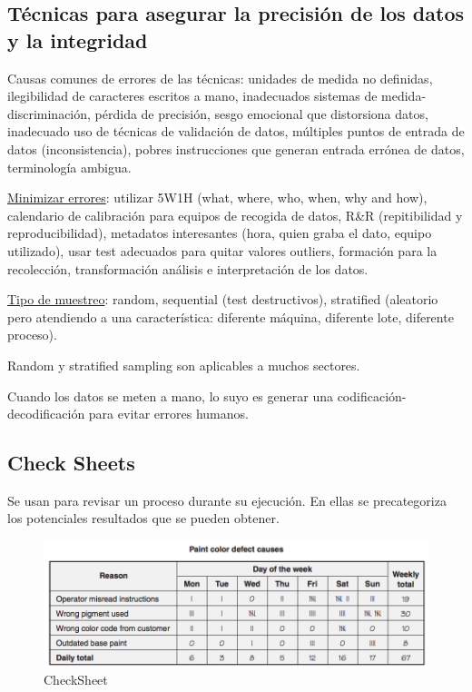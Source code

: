 \documentclass[oneside]{book}
\begin{document}
\subsection{Técnicas para asegurar la precisión de los datos y la integridad}

Causas comunes de errores de las técnicas: unidades de medida no definidas, ilegibilidad de caracteres escritos a mano, inadecuados sistemas de medida-discriminación, pérdida de precisión, sesgo emocional que distorsiona datos, inadecuado uso de técnicas de validación de datos, múltiples puntos de entrada de datos (inconsistencia), pobres instrucciones que generan entrada errónea de datos, terminología ambigua.

\underline{Minimizar errores}: utilizar 5W1H (what, where, who, when, why and how), calendario de calibración para equipos de recogida de datos, R\&R (repitibilidad y reproducibilidad), metadatos interesantes (hora, quien graba el dato, equipo utilizado), usar test adecuados para quitar valores outliers, formación para la recolección, transformación análisis e interpretación de los datos.

\underline{Tipo de muestreo}: random, sequential (test destructivos), stratified (aleatorio pero atendiendo a una característica: diferente máquina, diferente lote, diferente proceso).

Random y stratified sampling son aplicables a muchos sectores.

Cuando los datos se meten a mano, lo suyo es generar una codificación-decodificación para evitar errores humanos.

\subsection{Check Sheets}

Se usan para revisar un proceso durante su ejecución. En ellas se precategoriza los potenciales resultados que se pueden obtener.

\begin{figure}[ht!]
	\centering
	\includegraphics[width=120mm]{imagenes/CheckSheet.png}
	\caption{CheckSheet}
\end{figure}
\end{document}
